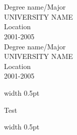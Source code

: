 \documentclass[12pt, a4paper, conference]{IEEEtran}
\newcommand{\borderthickness}{0.5pt}
\begin{document}
\begin{minipage}[t][5cm][t]{0.3\textwidth}
{}\\
\\
Degree name/Major\\
UNIVERSITY NAME\\
Location\\
2001-2005
\\

Degree name/Major\\
UNIVERSITY NAME\\
Location\\
2001-2005

\end{minipage}
\quad
\textcolor{bordercolour}{\vrule height 3ex width \borderthickness}
\quad
	
\begin{minipage}[t][5cm][t]{0.3\textwidth}
\color{white}Test
\end{minipage}
\quad
\textcolor{bordercolour}{\vrule height 4ex width \borderthickness}
\quad

\noindent\makebox[\linewidth]{\textcolor{bordercolour}{\rule{\paperwidth}{\borderthickness}}}
\end{document}
